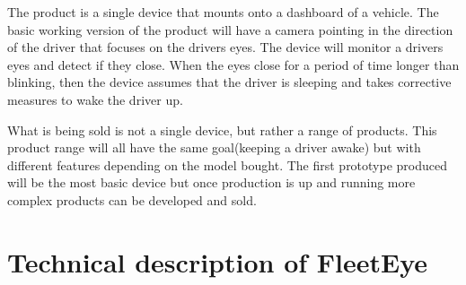 The product is a single device that mounts onto a dashboard of a vehicle. The basic working version of the product will have a camera pointing in the direction of the driver that focuses on the drivers eyes. The device will monitor a drivers eyes and detect if they close. When the eyes close for a period of time longer than blinking, then the device assumes that the driver is sleeping and takes corrective measures to wake the driver up.

What is being sold is not a single device, but rather a range of products. This product range will all have the same goal(keeping a driver awake) but with different features depending on the model bought. The first prototype produced will be the most basic device but once production is up and running more complex products can be developed and sold.

\section{Technical description of FleetEye}

